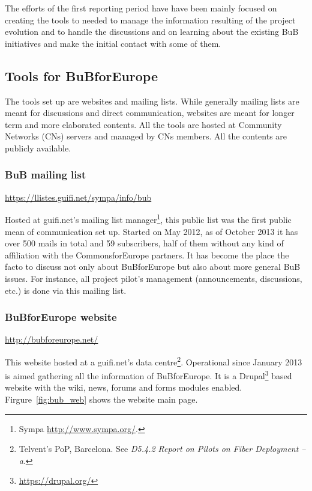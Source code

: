 The efforts of the first reporting period have have been mainly focused on creating the tools to needed to manage the information resulting of the project evolution and to handle the discussions and on learning about the existing BuB initiatives and make the initial contact with some of them.

\subsection{Tools for BuBforEurope}
\label{tools}

The tools set up are websites and mailing lists. While generally mailing lists are meant for discussions and direct communication, websites are meant for longer term and more elaborated contents. All the tools are hosted at Community Networks (CNs) servers and managed by CNs members. All the contents are publicly available.

\subsubsection{BuB mailing list}

\url{https://llistes.guifi.net/sympa/info/bub}

Hosted at guifi.net's mailing list manager\footnote{Sympa \url{http://www.sympa.org/}.}, this public list was the first public mean of communication set up. Started on May 2012, as of October 2013 it has over 500 mails in total and 59 subscribers, half of them without any kind of affiliation with the CommonsforEurope partners. It has become the place the facto to discuss not only about BuBforEurope but also about more general BuB issues. For instance, all project pilot's management (announcements, discussions, etc.) is done via this mailing list.


\subsubsection{BuBforEurope website}

\url{http://bubforeurope.net/}

This website hosted at a guifi.net's data centre\footnote{Telvent's PoP, Barcelona. See \emph{D5.4.2 Report on Pilots on Fiber Deployment -- a}.}. Operational since January 2013 is aimed gathering all the information of BuBforEurope. It is a Drupal\footnote{\url{https://drupal.org/}} based website with the wiki, news, forums and forms modules enabled. Firgure~\ref{fig:bub_web} shows the website main page.

